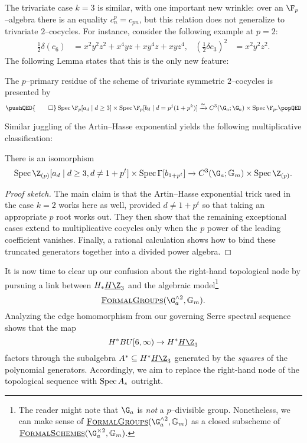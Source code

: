 The trivariate case $k = 3$ is similar, with one important new wrinkle: over an $\F_p$--algebra there is an equality $c_n^p = c_{pn}$, but this relation does not generalize to trivariate $2$--cocycles.  For instance, consider the following example at $p = 2$:
\begin{align*}
\frac{1}{2} \delta (c_6) & = x^2 y^2 z^2 + x^4 y z + x y^4 z + x y z^4, &
\left(\frac{1}{2} \delta c_3\right)^2 & = x^2 y^2 z^2.
\end{align*}
The following Lemma states that this is the only new feature:
\begin{lemma}
The $p$--primary residue of the scheme of trivariate symmetric $2$--cocycles is presented by
\[\pushQED{\qed}
\Spec \F_p[a_d \mid d \ge 3] \times \Spec \F_p[b_d \mid d = p^j(1 + p^k)] \xrightarrow{\cong} C^3(\G_a; \G_a) \times \Spec \F_p. \qedhere
\popQED\]
\end{lemma}

\noindent Similar juggling of the Artin--Hasse exponential yields the following multiplicative classification:
\begin{theorem}
There is an isomorphism \[\Spec \Z_{(p)}[a_d \mid d \ge 3, d \ne 1 + p^t] \times \Spec \Gamma[b_{1 + p^t}] \xrightarrow{} C^3(\G_a; \Gm) \times \Spec \Z_{(p)}.\]
\end{theorem}
\begin{proof}[Proof sketch]
The main claim is that the Artin--Hasse exponential trick used in the case $k = 2$ works here as well, provided $d \ne 1 + p^t$ so that taking an appropriate $p${\th} root works out.  They then show that the remaining exceptional cases extend to multiplicative cocycles only when the $p${\th} power of the leading coefficient vanishes.  Finally, a rational calculation shows how to bind these truncated generators together into a divided power algebra.
\end{proof}

It is now time to clear up our confusion about the right-hand topological node by pursuing a link between $H_* \OS{H\Z}{3}$ and the algebraic model\footnote{The reader might note that $\G_a$ is \emph{not} a $p$--divisible group.  Nonetheless, we can make sense of $\InternalHom{FormalGroups}(\G_a^{\sm 2}, \Gm)$ as a closed subscheme of $\InternalHom{FormalSchemes}(\G_a^{\times 2}, \Gm)$.} \[\InternalHom{FormalGroups}(\G_a^{\sm 2}, \Gm).\]  Analyzing the edge homomorphism from our governing Serre spectral sequence shows that the map \[H^* BU[6, \infty) \to H^* \OS{H\Z}{3}\] factors through the subalgebra $A^* \subseteq H^* \OS{H\Z}{3}$ generated by the \emph{squares} of the polynomial generators.  Accordingly, we aim to replace the right-hand node of the topological sequence with $\operatorname{Spec} A_*$ outright.

